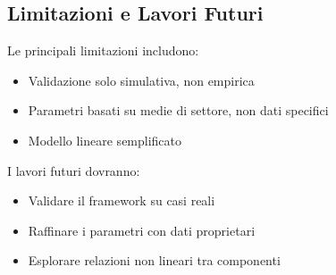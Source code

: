 \documentclass[12pt,a4paper,oneside]{book}
\numberwithin{figure}{chapter} %
\numberwithin{table}{chapter}  %
\begin{document}
\subsection{\texorpdfstring{\textbf{Limitazioni e Lavori Futuri}}{1.8.2 Limitazioni e Lavori Futuri}}\label{limitazione-lavori}

Le principali limitazioni includono:
\begin{itemize}
    \item Validazione solo simulativa, non empirica
    \item Parametri basati su medie di settore, non dati specifici
    \item Modello lineare semplificato
\end{itemize}

I lavori futuri dovranno:
\begin{itemize}
    \item Validare il framework su casi reali
    \item Raffinare i parametri con dati proprietari
    \item Esplorare relazioni non lineari tra componenti
\end{itemize}




\end{document}

